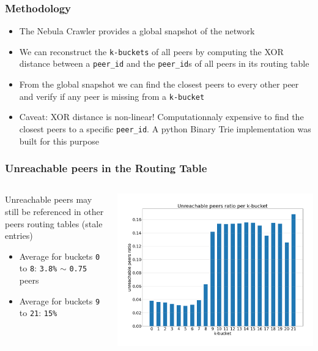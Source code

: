 \documentclass{pl-slide}
\begin{document}
\begin{frame}
\frametitle{Methodology}
\begin{itemize}
	\item The Nebula Crawler provides a global snapshot of the network
	\item We can reconstruct the \texttt{k-buckets} of all peers by computing the XOR distance between a \texttt{peer\_id} and the \texttt{peer\_id}s of all peers in its routing table
	\item From the global snapshot we can find the closest peers to every other peer and verify if any peer is missing from a \texttt{k-bucket}
    \item Caveat: XOR distance is non-linear! Computationnaly expensive to find the closest peers to a specific \texttt{peer\_id}. A python Binary Trie implementation was built for this purpose
\end{itemize}
\end{frame}


\begin{frame}
\frametitle{Unreachable peers in the Routing Table}

\begin{columns}[onlytextwidth]
\begin{column}{0.38\textwidth}
Unreachable peers may still be referenced in other peers routing tables (stale entries)
\bigskip
   \begin{itemize}
   		\item Average for buckets \texttt{0} to \texttt{8}: \texttt{3.8\%} $\sim$ \texttt{0.75} peers
   		\item Average for buckets \texttt{9} to \texttt{21}: \texttt{15\%}
   \end{itemize}
\end{column}
\begin{column}{0.58\textwidth}
    \begin{center}
		\includegraphics[width=\textwidth]{plots/unreachable-peers.png}
    \end{center}
\end{column}
\end{columns}
\end{frame}
\end{document}
